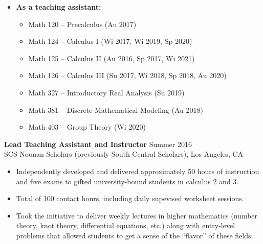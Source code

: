 \documentclass[margin]{res} %
\begin{document}
\begin{resume}
\begin{itemize}
\begin{itemize}
\end{itemize}
\item \textbf{As a teaching assistant:} 
\begin{itemize}
	\item Math 120 -- Precalculus (Au 2017)
	\item Math 124 -- Calculus I (Wi 2017, Wi 2019, Sp 2020)
	\item Math 125 -- Calculus II (Au 2016, Sp 2017, Wi 2021)
	\item Math 126 -- Calculus III (Su 2017, Wi 2018, Sp 2018, Au 2020)
	\item Math 327 -- Introductory Real Analysis (Su 2019)
	\item Math 381 -- Discrete Mathematical Modeling (Au 2018)
	\item Math 403 -- Group Theory (Wi 2020)
\end{itemize}
\end{itemize}
 
{\bf Lead Teaching Assistant and Instructor} \hfill Summer 2016 \\
SCS Noonan Scholars (previously South Central Scholars), Los Angeles, CA
\begin{itemize} \itemsep -1pt
\item Independently developed and delivered  approximately 50 hours of instruction and five exams to gifted university-bound students in calculus 2 and 3.
\item Total of 100 contact hours, including daily supevised worksheet sessions.
\item Took the initiative to deliver weekly lectures in higher mathematics (number theory, knot theory, differential equations, etc.) along with entry-level problems that allowed students to get a sense of the “flavor” of these fields.
\end{itemize} 


\end{resume}
\end{document}
